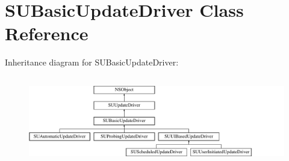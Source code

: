\hypertarget{interface_s_u_basic_update_driver}{}\section{S\+U\+Basic\+Update\+Driver Class Reference}
\label{interface_s_u_basic_update_driver}
Inheritance diagram for S\+U\+Basic\+Update\+Driver\+:\begin{figure}[H]
\begin{center}
\leavevmode
\includegraphics[height=3.888889cm]{interface_s_u_basic_update_driver}
\end{center}
\end{figure}
